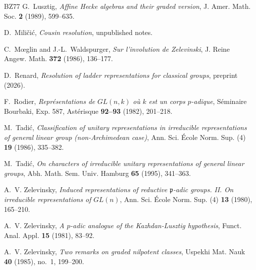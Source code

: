 \documentclass[a4paper,12pt,leqno]{amsart}
\theoremstyle{plain}
\theoremstyle{definition}
\theoremstyle{definition}
\begin{document}
\begin{thebibliography}{BZ77}
 G.~Lusztig, \emph{Affine Hecke algebras and their graded version}, J. Amer.
Math. Soc. \textbf{2} (1989), 599--635.

 D.~Mili\v{c}i\'c, \emph{Cousin resolution}, unpublished notes.

 C.~M\oe glin and J.-L.~Waldspurger, \emph{Sur l'involution de Zelevinski}, J.
Reine Angew. Math. \textbf{372} (1986), 136--177.

 D.~Renard, \emph{Resolution of ladder representations for classical groups},
preprint (2026).

 F.~Rodier, \emph{Repr\'esentations de $GL(n,k)$ o\`u $k$ est un corps
$p$-adique}, S\'eminaire Bourbaki, Exp. 587, Ast\'erisque \textbf{92--93} (1982), 201--218.

 M.~Tadi\'c, \emph{Classification of unitary representations in irreducible
representations of general linear group (non-Archimedean case)}, Ann. Sci. \'Ecole Norm. Sup. (4)
\textbf{19} (1986), 335--382.

 M.~Tadi\'c, \emph{On characters of irreducible unitary representations of
general linear groups}, Abh. Math. Sem. Univ. Hamburg \textbf{65} (1995), 341--363.

 A.~V. Zelevinsky, \emph{Induced representations of reductive ${\mathfrak
p}$-adic groups. II. On irreducible representations of $GL(n)$}, Ann. Sci. \'Ecole Norm. Sup. (4)
\textbf{13} (1980), 165--210.

 A.~V. Zelevinsky, \emph{A $p$-adic analogue of the Kazhdan-Lusztig
hypothesis}, Funct. Anal. Appl. \textbf{15} (1981), 83--92.

 A.~V. Zelevinsky, \emph{Two remarks on graded nilpotent classes}, Uspekhi
Mat. Nauk \textbf{40} (1985), no.~1, 199--200.

\end{thebibliography}
\end{document}
